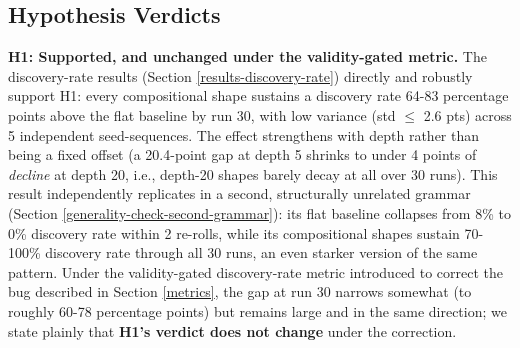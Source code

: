 \documentclass[]{article}
\begin{document}
        \subsection{Hypothesis Verdicts}\label{hypothesis-verdicts}

        \textbf{H1: Supported, and unchanged under the validity-gated metric.} The discovery-rate results (Section \ref{results-discovery-rate}) directly and robustly support H1: every compositional shape sustains a discovery rate 64-83 percentage points above the flat baseline by run 30, with low variance (std $\leq$ 2.6 pts) across 5 independent seed-sequences. The effect strengthens with depth rather than being a fixed offset (a 20.4-point gap at depth 5 shrinks to under 4 points of \textit{decline} at depth 20, i.e., depth-20 shapes barely decay at all over 30 runs). This result independently replicates in a second, structurally unrelated grammar (Section \ref{generality-check-second-grammar}): its flat baseline collapses from 8\% to 0\% discovery rate within 2 re-rolls, while its compositional shapes sustain 70-100\% discovery rate through all 30 runs, an even starker version of the same pattern. Under the validity-gated discovery-rate metric introduced to correct the bug described in Section \ref{metrics}, the gap at run 30 narrows somewhat (to roughly 60-78 percentage points) but remains large and in the same direction; we state plainly that \textbf{H1's verdict does not change} under the correction.
\end{document}
